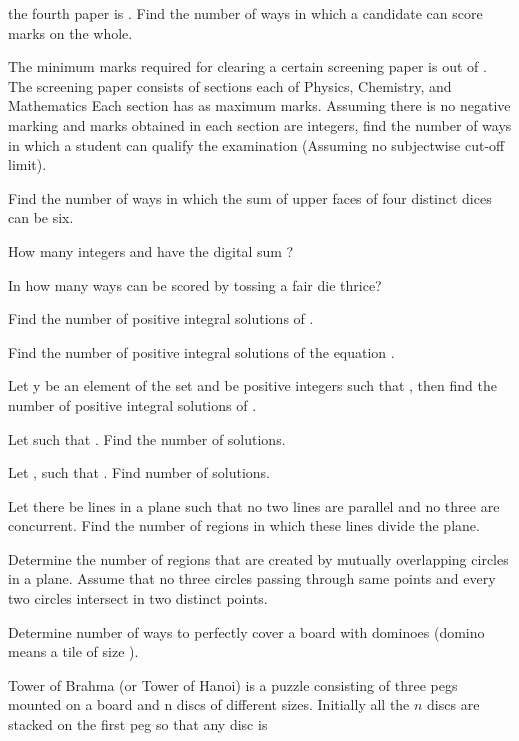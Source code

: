   the fourth paper is . Find the number of ways in which a candidate can score  marks on the
  whole.
\item The minimum marks required for clearing a certain screening paper is  out of . The
  screening paper consists of  sections each of Physics, Chemistry, and Mathematics Each section has
   as maximum marks. Assuming there is no negative marking and marks obtained in each section are
  integers, find the number of ways in which a student can qualify the examination (Assuming no subjectwise
  cut-off limit).
\item Find the number of ways in which the sum of upper faces of four distinct dices can be six.
\item How many integers  and  have the digital sum ?
\item In how many ways can  be scored by tossing a fair die thrice?
\item Find the number of positive integral solutions of .
\item Find the number of positive integral solutions of the equation .
\item Let y be an element of the set  and  be positive
  integers such that , then find the number of positive integral solutions of .
\item Let  such that . Find the number of
  solutions.
\item Let , such that . Find number of
  solutions.
\item Let there be  lines in a plane such that no two lines are parallel and no three are
  concurrent. Find the number of regions in which these lines divide the plane.
\item Determine the number of regions that are created by  mutually overlapping circles in a
  plane. Assume that no three circles passing through same points and every two circles intersect in two
  distinct points.
\item Determine number of ways to perfectly cover a  board with dominoes (domino means a tile
  of size ).
\item Tower of Brahma (or Tower of Hanoi) is a puzzle consisting of three pegs mounted on a board and n
  discs of different sizes. Initially all the $n$ discs are stacked on the first peg so that any disc is
